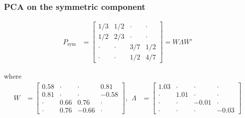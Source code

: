\documentclass[10pt]{beamer}
\begin{document}
\begin{frame}[label=industry_sym_pca]
\frametitle{PCA on the symmetric component}
\begin{align*}
P_\text{sym} & = \begin{bmatrix} 1/3 & 1/2 & \cdot & \cdot \\
1/2 & 2/3 & \cdot & \cdot \\ 
\cdot & \cdot & 3/7 & 1/2 \\
\cdot & \cdot & 1/2 & 4/7
\end{bmatrix} = W \Lambda W'
\end{align*}

where 
\begin{align*}
    W & = \begin{bmatrix} 0.58 & \cdot & \cdot & 0.81 \\
0.81 & \cdot & \cdot & -0.58 \\ 
\cdot & 0.66 & 0.76 & \cdot \\
\cdot & 0.76 & -0.66 & \cdot
\end{bmatrix}, ~~ \Lambda & = \begin{bmatrix} 1.03 & \cdot & \cdot & \cdot \\
\cdot & 1.01 & \cdot & \cdot \\ 
\cdot & \cdot & -0.01 & \cdot \\
\cdot & \cdot & \cdot & -0.03
\end{bmatrix}
\end{align*}
~\hfill \hyperlink{industry_example}{}
\end{frame}
\end{document}
